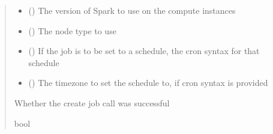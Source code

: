 \documentclass[letterpaper,10pt,english]{sphinxmanual}
\begin{document}
\begin{fulllineitems}
\begin{fulllineitems}
\begin{quote}
\begin{description}
\begin{itemize}
\item {} 
\sphinxAtStartPar
{} () \textendash{} The version of Spark to use on the compute instances

\item {} 
\sphinxAtStartPar
{} () \textendash{} The node type to use

\item {} 
\sphinxAtStartPar
{} (\sphinxstyleliteralemphasis{\sphinxupquote{ (}}\sphinxstyleliteralemphasis{\sphinxupquote{)}}) \textendash{} If the job is to be set to a schedule, the cron syntax for that schedule

\item {} 
\sphinxAtStartPar
{} (\sphinxstyleliteralemphasis{\sphinxupquote{ (}}\sphinxstyleliteralemphasis{\sphinxupquote{)}}) \textendash{} The timezone to set the schedule to, if cron syntax is provided

\end{itemize}

\sphinxAtStartPar
{} \textendash{} Whether the create job call was successful

\sphinxAtStartPar
bool

\end{description}\end{quote}

\end{fulllineitems}



\end{fulllineitems}
\end{document}
